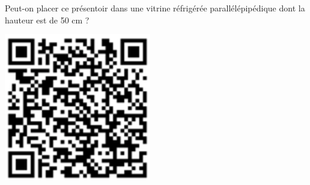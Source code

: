 \documentclass[openany]{book}
\begin{document}
Peut-on placer ce présentoir dans une vitrine réfrigérée parallélépipédique dont la hauteur est de
50 cm ?

\includegraphics[scale=0.5]{solide2.eps}


%
%
\end{document}
